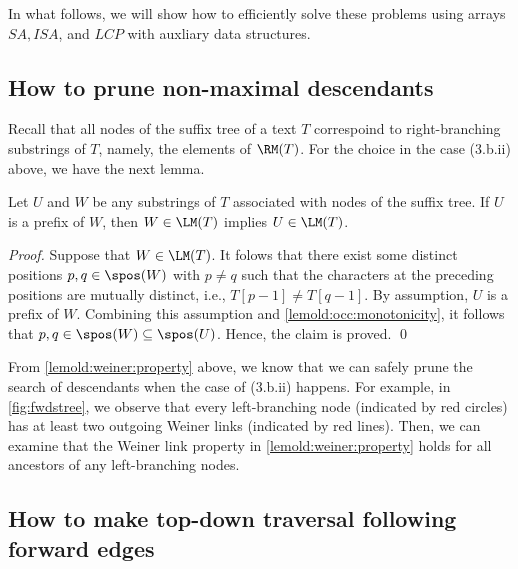 In what follows, we will show how to efficiently solve these problems using arrays $SA, ISA$, and $LCP$ with auxliary data structures. 

\subsection{How to prune non-maximal descendants}

Recall that all nodes of the suffix tree of a text $T$ correspoind to right-branching substrings of $T$, namely, the elements of $\RM(T)$. 
For the choice in the case (3.b.ii) above, we have the next lemma. 

\begin{lemma}
\label{lemold:weiner:property}
Let $U$ and $W$ be any substrings of $T$ associated with nodes of the suffix tree. If $U$ is a prefix of $W$, then $W \in \LM(T)$ implies $U \in \LM(T)$. 
\end{lemma}

\begin{proof}
Suppose that $W \in \LM(T)$. It folows that there exist some distinct positions $p, q \in \spos(W)$ with $p\not= q$ such that the characters at the preceding positions are mutually distinct, i.e., $T[p-1]\not = T[q-1]$. By assumption, $U$ is a prefix of $W$. Combining this assumption and \cref{lemold:occ:monotonicity}, it follows  that $p,q \in \spos(W) \subseteq \spos(U)$. Hence, the claim is proved. 
\qed
\end{proof}

From \cref{lemold:weiner:property} above, we know that we can safely prune the search of descendants when the case of (3.b.ii)  happens.
For example, in \cref{fig:fwdstree}, we observe that every left-branching node (indicated by red circles) has at least two outgoing Weiner links (indicated by red lines). Then, we can examine that the Weiner link property in \cref{lemold:weiner:property} holds for all ancestors of any left-branching nodes. 

\subsection{How to make top-down traversal following forward edges}


